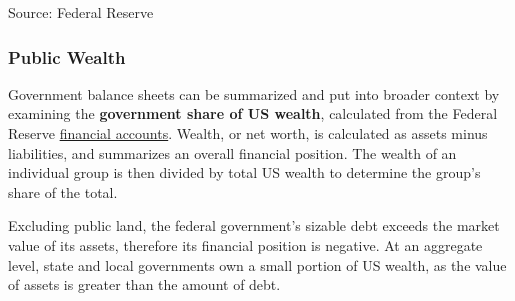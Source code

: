 \documentclass{report}
\makeatletter
\newcommand{\tbllink}[1]{\href{https://raw.githubusercontent.com/bdecon/US-chartbook/master/chartbook/data/#1}{\faTable}}
\newcommand*\short[1]{\expandafter\@gobbletwo\number\numexpr#1\relax}
\newcommand{\absnode}[3]{\node[below right, align=left] at (axis cs: #1,#2) {#3};}
\newcommand{\shdateaxisticks}{
		date coordinates in=x, axis line style={draw=none},
		xmax={2023-11-01},
		max space between ticks=40,	    
		xtick={{1990-01-01}, {1995-01-01}, {2000-01-01}, 
			{2005-01-01}, {2010-01-01}, {2015-01-01}, {2020-01-01}},
		minor xtick={},
		enlarge y limits={0.06}, enlarge x limits={0.01},
		}
\newcommand{\bbar}[2]{extra #1 ticks = {{#2}}, extra #1 tick labels = ,
		extra #1 tick style = {grid=major, grid style={thick, black!25}},}
\newcommand{\thickline}[4]{\addplot[ultra thick, no markers, color=#1] 
		table [x=#2, y=#3, col sep=comma] {#4};	}
\newcommand{\rbars}{
		\fill[color=black!10] (axis cs:{1990-07-01},\pgfkeysvalueof{/pgfplots/ymin}) rectangle 
			(axis cs:{1991-03-01}, \pgfkeysvalueof{/pgfplots/ymax});
		\fill[color=black!10] (axis cs:{2007-12-01},\pgfkeysvalueof{/pgfplots/ymin}) rectangle 
			(axis cs:{2009-07-01}, \pgfkeysvalueof{/pgfplots/ymax});
		\fill[color=black!10] (axis cs:{2001-03-01},\pgfkeysvalueof{/pgfplots/ymin}) rectangle 
			(axis cs:{2001-11-01}, \pgfkeysvalueof{/pgfplots/ymax});
		\fill[color=black!10] (axis cs:{2020-02-01},\pgfkeysvalueof{/pgfplots/ymin}) rectangle 
			(axis cs:{2020-05-01}, \pgfkeysvalueof{/pgfplots/ymax});}
\makeatother
\begin{document}
{\begin{minipage}{0.37\textwidth}
\hspace{4mm} 

\footnotesize{Source: Federal Reserve} \hfill \tbllink{gov_bs_summary.csv}
\end{minipage} 
\vspace{1mm}

\begin{minipage}{0.76\textwidth}
\subsubsection*{Public Wealth}
\vspace*{-1mm}

\small Government balance sheets can be summarized and put into broader context by examining the \textbf{government share of US wealth}, calculated from the Federal Reserve \href{https://www.federalreserve.gov/releases/z1/}{financial accounts}. Wealth, or net worth, is calculated as assets minus liabilities, and summarizes an overall financial position. The wealth of an individual group is then divided by total US wealth to determine the group's share of the total.

Excluding public land, the federal government's sizable debt exceeds the market value of its assets, therefore its financial position is negative. At an aggregate level, state and local governments own a small portion of US wealth, as the value of assets is greater than the amount of debt. 
\end{minipage}

}
\end{document}
